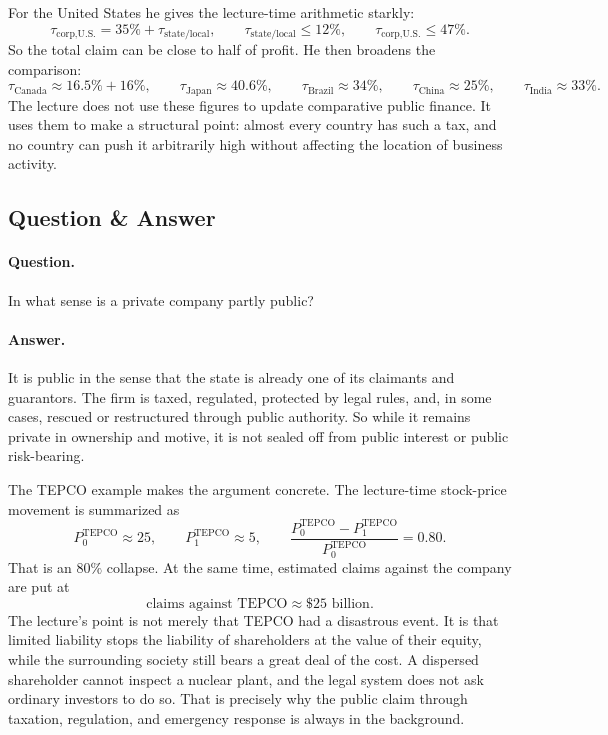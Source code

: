 For the United States he gives the lecture-time arithmetic starkly:
\begin{equation}
\tau_{\text{corp,U.S.}} = 35\% + \tau_{\text{state/local}},
\qquad
\tau_{\text{state/local}} \le 12\%,
\qquad
\tau_{\text{corp,U.S.}} \le 47\%.
\end{equation}
So the total claim can be close to half of profit. He then broadens the comparison:
\begin{equation}
\tau_{\text{Canada}} \approx 16.5\% + 16\%,
\qquad
\tau_{\text{Japan}} \approx 40.6\%,
\qquad
\tau_{\text{Brazil}} \approx 34\%,
\qquad
\tau_{\text{China}} \approx 25\%,
\qquad
\tau_{\text{India}} \approx 33\%.
\end{equation}
The lecture does not use these figures to update comparative public finance. It uses them to make a structural point: almost every country has such a tax, and no country can push it arbitrarily high without affecting the location of business activity.

\subsection{Question \& Answer}

\paragraph{Question.} In what sense is a private company partly public?

\paragraph{Answer.} It is public in the sense that the state is already one of its claimants and guarantors. The firm is taxed, regulated, protected by legal rules, and, in some cases, rescued or restructured through public authority. So while it remains private in ownership and motive, it is not sealed off from public interest or public risk-bearing.

The TEPCO example makes the argument concrete. The lecture-time stock-price movement is summarized as
\begin{equation}
P_0^{\text{TEPCO}} \approx 25,
\qquad
P_1^{\text{TEPCO}} \approx 5,
\qquad
\frac{P_0^{\text{TEPCO}}-P_1^{\text{TEPCO}}}{P_0^{\text{TEPCO}}}=0.80.
\end{equation}
That is an \(80\%\) collapse. At the same time, estimated claims against the company are put at
\begin{equation}
\text{claims against TEPCO} \approx \$25\text{ billion}.
\end{equation}
The lecture's point is not merely that TEPCO had a disastrous event. It is that limited liability stops the liability of shareholders at the value of their equity, while the surrounding society still bears a great deal of the cost. A dispersed shareholder cannot inspect a nuclear plant, and the legal system does not ask ordinary investors to do so. That is precisely why the public claim through taxation, regulation, and emergency response is always in the background.

